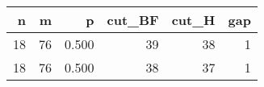\begin{tabular}{rrrrrr}
\toprule
n & m & p & cut\_BF & cut\_H & gap \\
\midrule
18 & 76 & 0.500 & 39 & 38 & 1 \\
18 & 76 & 0.500 & 38 & 37 & 1 \\
\bottomrule
\end{tabular}
